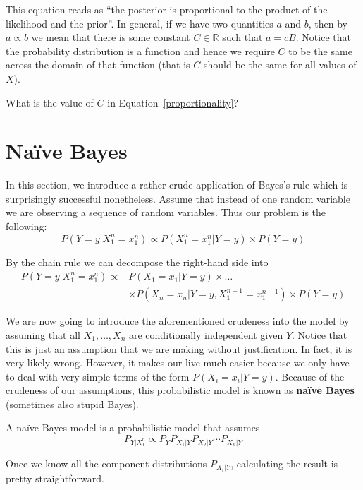 This equation reads as ``the posterior is proportional to the product of the likelihood and the prior''. In general, if we have two quantities
$ a $ and $ b $, then by $ a \propto b $ we mean that there is some constant $ C \in \mathbb{R} $ such that $ a = cB $. Notice
that the probability distribution is a function and hence we require $ C $ to be the same across the domain of that function (that
is $ C $ should be the same for all values of $ X $).

\begin{Exercise}
What is the value of $ C $ in Equation~\eqref{proportionality}?
\end{Exercise}



\section{Na\"ive Bayes}
In this section, we introduce a rather crude application of Bayes's rule which is surprisingly successful nonetheless.
Assume that instead of one random variable we are observing a sequence of random variables. Thus our problem is the following:
\begin{equation}
P(Y=y|X_{1}^{n}=x_{1}^{n}) \propto P(X_{1}^{n}=x_{1}^{n}|Y=y) \times P(Y=y) 
\end{equation}

By the chain rule we can decompose the right-hand side into
\begin{align}
P(Y=y|X_{1}^{n}=x_{1}^{n})
\propto &P(X_{1}=x_{1}|Y=y) \times \ldots \nonumber \\
&\times P(X_{n}=x_{n}|Y=y,X_{1}^{n-1}=x_1^{n-1}) \times P(Y=y) \nonumber
\end{align}

We are now going to introduce the aforementioned crudeness into the model by assuming that all $ X_1,\ldots,X_n$ are conditionally independent given $ Y $. Notice that
this is just an assumption that we are making without justification. In fact, it is very likely wrong. However, it makes our
live much easier because we only have to deal with very simple terms of the form $ P(X_{i}=x_{i}|Y=y) $. Because of the
crudeness of our assumptions, this probabilistic model is known as \textbf{na\"ive Bayes} (sometimes also 
stupid Bayes).

\begin{Definition}
A na\"ive Bayes model is a probabilistic model that assumes
$$ P_{Y|X_{1}^{n}} \propto P_Y P_{X_{1}|Y} P_{X_{2}|Y} \cdots P_{X_{n}|Y} $$
\end{Definition}
Once we know all the component distributions $P_{X_i|Y}$, calculating the result is pretty straightforward. 

